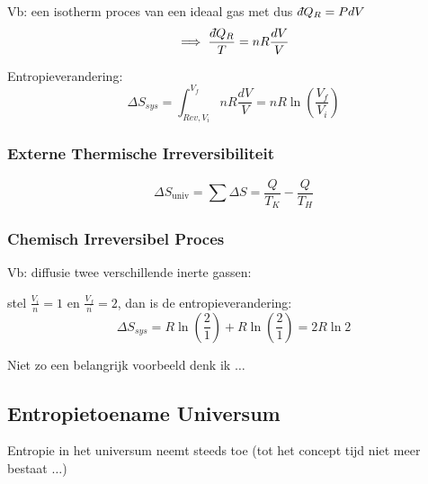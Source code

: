 Vb: een isotherm proces van een ideaal gas met dus \(\dbar Q_R = PdV\)
\[\implies \frac{\dbar Q_R}{T} = nR\frac{dV}{V}\]

Entropieverandering:
\[\Delta S_{sys} = \int_{Rev,V_i}^{V_f} nR\frac{dV}{V} = nR \ln \left(\frac{V_f}{V_i}\right)\]

\subsubsection{Externe Thermische Irreversibiliteit}
\[\Delta S_{\text{univ}} = \sum \Delta S = \frac{Q}{T_K} - \frac{Q}{T_H}\]

\subsubsection{Chemisch Irreversibel Proces}

Vb: diffusie twee verschillende inerte gassen:

stel \(\frac{V_i}{n} = 1\) en \(\frac{V_f}{n} = 2\), dan is de entropieverandering:
\[\Delta S_{sys} =  R \ln \left(\frac{2}{1}\right) + R \ln \left(\frac{2}{1}\right) = 2R \ln 2\]

Niet zo een belangrijk voorbeeld denk ik \(\dots\)

\subsection{Entropietoename Universum}

Entropie in het universum neemt steeds toe (tot het concept tijd niet meer bestaat \(\dots\))

